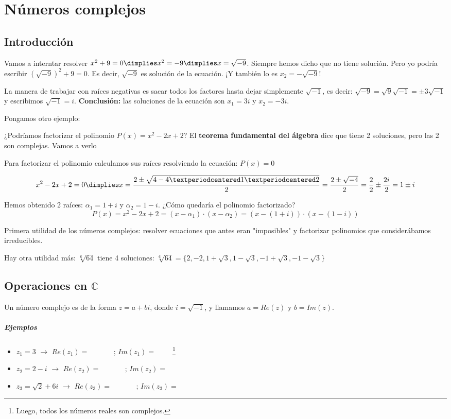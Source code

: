 
\chapter{Números complejos}

\section{Introducción} 
Vamos a interntar resolver $x^2 + 9 = 0 \dimplies x^2 = -9 \dimplies x=\sqrt{-9}$. Siempre hemos dicho que no tiene solución. Pero yo podría escribir $(\sqrt{-9})^2 + 9 = 0$. Es decir, $\sqrt{-9}$ es solución de la ecuación. ¡Y también lo es $x_2=-\sqrt{-9}$!

La manera de trabajar con raíces negativas es sacar todos los factores hasta dejar simplemente $\sqrt{-1}$, es decir: $\sqrt{-9} = \sqrt{9}\sqrt{-1} = \pm3\sqrt{-1}$ y escribimos $\sqrt{-1} = i$. \textbf{Conclusión:} las soluciones de la ecuación son $x_1 = 3i$ y $x_2 = -3i$.

Pongamos otro ejemplo:


¿Podríamos factorizar el polinomio $P(x) = x^2-2x+2$? El \textbf{teorema fundamental del álgebra} dice que tiene 2 soluciones, pero las 2 son complejas. Vamos a verlo

Para factorizar el polinomio calculamos sus raíces resolviendo la ecuación: $P(x) = 0$

\[x^2-2x+2 = 0 \dimplies x=\frac{2\pm\sqrt{4-4·1·2}}{2} = \frac{2\pm\sqrt{-4}}{2} = \frac{2}{2} \pm \frac{2i}{2} = 1\pm i\]

Hemos obtenido 2 raíces: $α_1 = 1+i$ y $α_2 = 1-i$. ¿Cómo quedaría el polinomio factorizado? \[P(x) = x^2-2x+2 = (x-α_1)·(x-α_2) = (x-(1+i))·(x-(1-i))\]

Primera utilidad de los números complejos: resolver ecuaciones que antes eran "imposibles" y factorizar polinomios que considerábamos irreducibles.

Hay otra utilidad más: $\sqrt[6]{64}$ tiene 4 soluciones: $\sqrt[6]{64} = \{ 2,-2,1+\sqrt{3},1-\sqrt{3},-1+\sqrt{3},-1-\sqrt{3}\}$

\section{Operaciones en $ℂ$}

Un número complejo es de la forma $z=a+bi$, donde $i=\sqrt{-1}$, y llamamos $a=Re(z)$ y $b=Im(z)$. 

\paragraph{Ejemplos}
\begin{itemize}
	\item $z_1 = 3$ $\to$ $Re(z_1) = \;\;\quad\quad\;\;\;$; $Im(z_1) = \;\;\;\;\;\;\;$ \footnote{Luego, todos los números reales son complejos.}
	\item $z_2 = 2-i$ $\to$ $Re(z_2) = \;\;\quad\quad\;\;\;$; $Im(z_2) = \;\;\;\;\;\;\;$
	\item $z_3 = \sqrt{2}+6i$ $\to$ $Re(z_3) = \;\;\quad\quad\;\;\;$; $Im(z_3) = \;\;\;\;\;\;\;$
\end{itemize}

